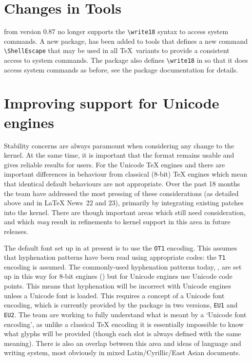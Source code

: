 \documentclass{ltnews}
\begin{document}
\section{Changes in Tools}

 from version 0.87 no longer supports the
\verb|\write18| syntax to access system commands. A new package,
 has been added to \textsf{tools} that defines a new
command \verb|\ShellEscape| that may be used in all \TeX\ variants to
provide a consistent access to system commands. The package also
defines \verb|\write18| in   so that it does access
system commands as before, see the package documentation for details.

\section{Improving support for Unicode engines}

Stability concerns are always paramount when considering any change to
the \LaTeXe{} kernel. At the same time, it is important that the format
remains usable and gives reliable results for users. For the Unicode
\TeX{} engines  and  there are important
differences in behaviour from classical ($8$-bit) \TeX{} engines which
mean that identical default behaviours are not appropriate. Over the
past 18 months the team have addressed the most pressing of these
considerations (as detailed above and in \LaTeX{} News~22 and 23),
primarily by integrating existing patches into the kernel. There are
though important areas which still need consideration, and which
\emph{may} result in refinements to kernel support in this area in
future releases.

The default font set up in \LaTeXe{} at present is to use the \texttt{OT1}
encoding. This assumes that hyphenation patterns have been read using
appropriate codes: the \texttt{T1} encoding is assumed. The commonly-used
hyphenation patterns today, , are set up in this
way for $8$-bit engines () but for Unicode engines use
Unicode code points. This means that hyphenation will be incorrect
with Unicode engines unless a Unicode font is loaded. This requires
a concept of a Unicode font encoding, which is currently provided by
the  package in two versions, \texttt{EU1} and
\texttt{EU2}. The team are working to fully understand what is meant
by a `Unicode font encoding', as unlike a classical \TeX{} encoding
it is essentially impossible to know what glyphs will be provided
(though each slot is always defined with the same meaning).  There
is also an overlap between this area and ideas of language and writing
system, most obviously in mixed Latin/Cyrillic/East Asian documents.
\end{document}
